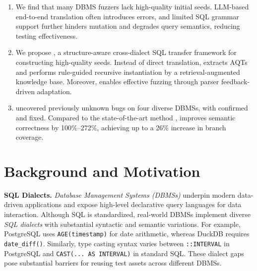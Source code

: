 \documentclass[sigconf,review,anonymous]{acmart}
\begin{document}
\begin{enumerate}[leftmargin=*]
\item We find that many DBMS fuzzers lack high-quality initial seeds. LLM-based end-to-end translation often introduces errors, and limited SQL grammar support further hinders mutation and degrades query semantics, reducing testing effectiveness.
\item We propose \tool{}, a structure-aware cross-dialect SQL transfer framework for constructing high-quality seeds. Instead of direct translation, \tool{} extracts AQTs and performs rule-guided recursive instantiation by a retrieval-augmented knowledge base. Moreover, \tool{} enables effective fuzzing through parser feedback-driven adaptation.
\item \tool{} uncovered \bugcnt{} previously unknown bugs on four diverse DBMSs, with \bugconfirmcnt{} confirmed and \bugfixcnt{} fixed. 
Compared to the state-of-the-art method \sedar{}, \tool{} improves semantic correctness by 100\%--272\%, achieving up to a 26\% increase in branch coverage.
\end{enumerate}

\section{Background and Motivation}
\label{sec:background}
\textbf{SQL Dialects.} 
\textit{Database Management Systems (DBMSs)} underpin modern data-driven applications and expose high-level declarative query languages for data interaction. Although SQL is standardized, real-world DBMSs implement diverse \textit{SQL dialects} with substantial syntactic and semantic variations.
For example, PostgreSQL uses \texttt{AGE(timestamp)} for date arithmetic, whereas DuckDB requires \texttt{date\_diff()}. Similarly, type casting syntax varies between \texttt{::INTERVAL} in PostgreSQL and \texttt{CAST(... AS INTERVAL)} in standard SQL. 
These dialect gaps pose substantial barriers for reusing test assets across different DBMSs.
\end{document}
